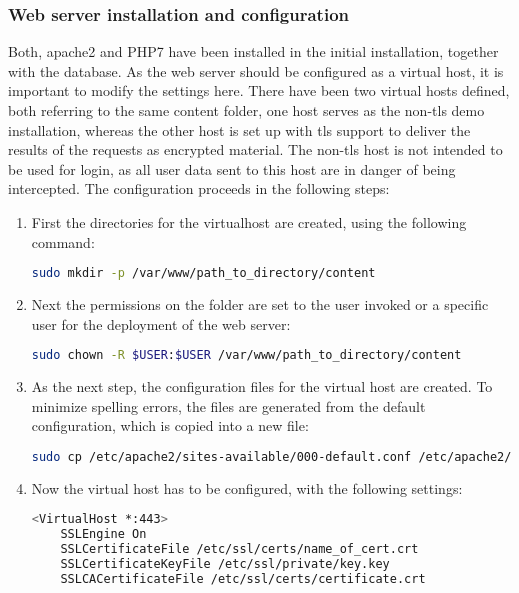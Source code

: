 \subsubsection{Web server installation and configuration}
Both, apache2 and PHP7 have been installed in the initial installation, together with the database. As the web server should be configured as a virtual host, it is important to 
modify the settings here. There have been two virtual hosts defined, both referring to the same content folder, one host serves as the non-tls demo installation, whereas the other
host is set up with tls support to deliver the results of the requests as encrypted material. The non-tls host is not intended to be used for login, as all user data sent to this host
are in danger of being intercepted. The configuration proceeds in the following steps:
\begin{enumerate}
 \item First the directories for the virtualhost are created, using the following command:\\
 \begin{lstlisting}[language=bash]
  sudo mkdir -p /var/www/path_to_directory/content
 \end{lstlisting}
 \item Next the permissions on the folder are set to the user invoked or a specific user for the deployment of the web server:\\
 \begin{lstlisting}[language=bash]
  sudo chown -R $USER:$USER /var/www/path_to_directory/content
 \end{lstlisting}
 \item As the next step, the configuration files for the virtual host are created. To minimize spelling errors, the files are generated from the default configuration, which is 
 copied into a new file:\\
 \begin{lstlisting}[language=bash]
  sudo cp /etc/apache2/sites-available/000-default.conf /etc/apache2/sites-available/name_virtual_host.conf
 \end{lstlisting}
 \item Now the virtual host has to be configured, with the following settings:\\
 \begin{lstlisting}[language=bash]
  <VirtualHost *:443>
	SSLEngine On
	SSLCertificateFile /etc/ssl/certs/name_of_cert.crt
	SSLCertificateKeyFile /etc/ssl/private/key.key
	SSLCACertificateFile /etc/ssl/certs/certificate.crt

\end{lstlisting}
\end{enumerate}
